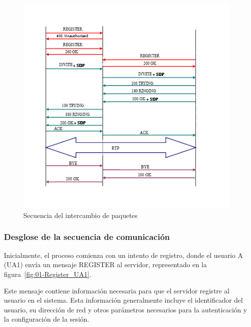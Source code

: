 \documentclass[a4paper, 12pt]{book}
\begin{document}
\begin{figure}
  \centering
  \includegraphics[width=15cm, keepaspectratio]{img/resultados/Secuencia_Paquetes.png}
  \caption{Secuencia del intercambio de paquetes}
  \label{fig:Secuencia_Paquetes}
\end{figure}



\clearpage
\subsubsection{Desglose de la secuencia de comunicación}
\label{subsubsec:secuencia_comunicacion2}

Inicialmente, el proceso comienza con un intento de registro, donde el usuario A (UA1) envía un mensaje REGISTER al servidor, 
representado en la figura~\ref{fig:01-Register_UA1}. 

Este mensaje contiene información necesaria para que el servidor registre al usuario en el sistema.
Esta información generalmente incluye el identificador del usuario, su dirección de red y otros parámetros necesarios para la autenticación y la 
configuración de la sesión.

\bigskip
\end{document}
